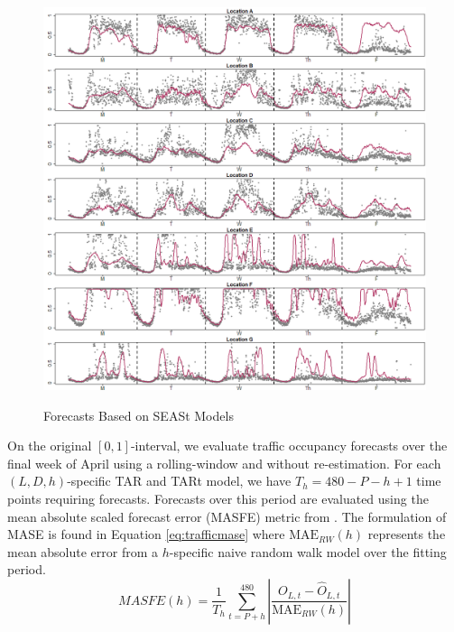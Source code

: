 \begin{figure}[htbp]
\caption{Forecasts Based on SEASt Models}
\includegraphics[width=\textwidth]{SEASESTtPlots}
\label{fig:SEASESTtPlots}
\end{figure}

On the original $[0,1]$-interval, we evaluate traffic occupancy forecasts over the final week of April using a rolling-window and without re-estimation. For each $(L,D,h)$-specific TAR and TARt model, we have $T_h=480-P-h+1$ time points requiring forecasts. Forecasts over this period are evaluated using the mean absolute scaled forecast error (MASFE) metric from \cite{Hyndman2006}. The formulation of MASE is found in Equation \ref{eq:trafficmase} where $\textrm{MAE}_{RW}(h)$ represents the mean absolute error from a $h$-specific naive random walk model over the fitting period. 
\begin{equation}
\label{eq:trafficmase}
  MASFE(h)=\frac{1}{T_h}\sum\limits_{t=P+h}^{480}\left|\frac{O_{L,t}-\widehat{O}_{L,t}}{\textrm{MAE}_{RW}(h)}\right|
\end{equation}

